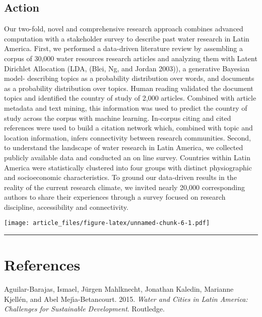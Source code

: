 \documentclass[]{article}
\begin{document}
\hypertarget{action}{%
\subsection{Action}\label{action}}

Our two-fold, novel and comprehensive research approach combines
advanced computation with a stakeholder survey to describe past water
research in Latin America. First, we performed a data-driven literature
review by assembling a corpus of 30,000 water resources research
articles and analyzing them with Latent Dirichlet Allocation (LDA,
(Blei, Ng, and Jordan 2003)), a generative Bayesian model- describing
topics as a probability distribution over words, and documents as a
probability distribution over topics. Human reading validated the
document topics and identified the country of study of 2,000 articles.
Combined with article metadata and text mining, this information was
used to predict the country of study across the corpus with machine
learning. In-corpus citing and cited references were used to build a
citation network which, combined with topic and location information,
infers connectivity between research communities. Second, to understand
the landscape of water research in Latin America, we collected publicly
available data and conducted an on line survey. Countries within Latin
America were statistically clustered into four groups with distinct
physiographic and socioeconomic characteristics. To ground our
data-driven results in the reality of the current research climate, we
invited nearly 20,000 corresponding authors to share their experiences
through a survey focused on research discipline, accessibility and
connectivity.

\texttt{[image: article\_files/figure-latex/unnamed-chunk-6-1.pdf]}

\begin{center}\rule{0.5\linewidth}{\linethickness}\end{center}

\hypertarget{references}{%
\section*{References}\label{references}}

\hypertarget{refs}{}
\leavevmode\hypertarget{ref-Aguilar2015}{}%
Aguilar-Barajas, Ismael, Jürgen Mahlknecht, Jonathan Kaledin, Marianne
Kjellén, and Abel Mejı́a-Betancourt. 2015. \emph{Water and Cities in
Latin America: Challenges for Sustainable Development}. Routledge.
\end{document}
